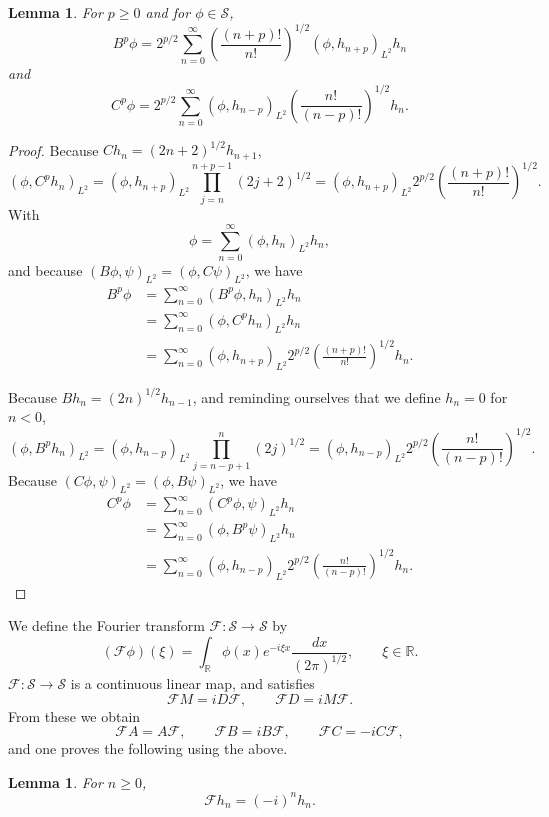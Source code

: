\documentclass{article}
\newtheorem{lemma}[theorem]{Lemma}
\theoremstyle{definition}
\begin{document}
\begin{lemma}
For $p \geq 0$ and for $\phi \in \mathscr{S}$,
\[
B^p \phi = 2^{p/2}\sum_{n=0}^\infty \left( \frac{(n+p)!}{n!} \right)^{1/2} (\phi,h_{n+p})_{L^2}   h_n
\]
and
\[
C^p \phi =2^{p/2} \sum_{n=0}^\infty (\phi,h_{n-p})_{L^2}  \left( \frac{n!}{(n-p)!} \right)^{1/2} h_n.
\]
\end{lemma}
\begin{proof}
Because $Ch_n=(2n+2)^{1/2}h_{n+1}$,
\[
(\phi,C^p h_n)_{L^2}
=(\phi,h_{n+p})_{L^2} \prod_{j=n}^{n+p-1}(2j+2)^{1/2} 
=(\phi,h_{n+p})_{L^2} 2^{p/2}  \left( \frac{(n+p)!}{n!} \right)^{1/2}.
\]
With
\[
\phi = \sum_{n=0}^\infty (\phi,h_n)_{L^2} h_n,
\]
and because $(B\phi,\psi)_{L^2}=(\phi,C\psi)_{L^2}$, we have
\begin{align*}
B^p \phi &= \sum_{n=0}^\infty (B^p \phi,h_n)_{L^2} h_n\\
&=\sum_{n=0}^\infty  (\phi,C^p h_n)_{L^2} h_n\\
&=\sum_{n=0}^\infty (\phi,h_{n+p})_{L^2} 2^{p/2} \left( \frac{(n+p)!}{n!} \right)^{1/2} h_n.
\end{align*}

Because $Bh_n=(2n)^{1/2}h_{n-1}$, and reminding ourselves that we define $h_n=0$ for $n<0$,
\[
(\phi,B^ph_n)_{L^2}=(\phi,h_{n-p})_{L^2} \prod_{j=n-p+1}^n (2j)^{1/2}
=(\phi,h_{n-p})_{L^2} 2^{p/2} \left( \frac{n!}{(n-p)!} \right)^{1/2}.
\]
Because $(C\phi,\psi)_{L^2}=(\phi,B\psi)_{L^2}$, we have
\begin{align*}
C^p\phi&=\sum_{n=0}^\infty (C^p\phi,\psi)_{L^2} h_n\\
&=\sum_{n=0}^\infty (\phi,B^p\psi)_{L^2} h_n\\
&=\sum_{n=0}^\infty (\phi,h_{n-p})_{L^2} 2^{p/2} \left( \frac{n!}{(n-p)!} \right)^{1/2} h_n.
\end{align*}
\end{proof}

We define the Fourier transform $\mathscr{F}:\mathscr{S} \to \mathscr{S}$ by
\[
(\mathscr{F}\phi)(\xi) = \int_{\mathbb{R}} \phi(x) e^{-i\xi x} \frac{dx}{(2\pi)^{1/2}},\qquad \xi \in \mathbb{R}.
\]
$\mathscr{F}:\mathscr{S} \to \mathscr{S}$ is a continuous linear map, and satisfies
\[
\mathscr{F}M = iD\mathscr{F},\qquad \mathscr{F}D = iM\mathscr{F}. 
\]
From these we obtain
\[
\mathscr{F}A=A\mathscr{F},\qquad \mathscr{F}B=iB\mathscr{F},\qquad \mathscr{F}C=-iC\mathscr{F},
\]
and one proves the following using the above.

\begin{lemma}
For $n \geq 0$,
\[
\mathscr{F}h_n = (-i)^n h_n.
\] 
\end{lemma}
\end{document}
